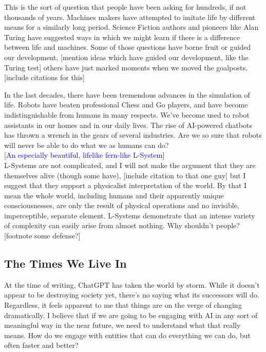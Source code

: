 \documentclass[12pt,twoside]{reedthesis}
\begin{document}
	This is the sort of question that people have been asking for hundreds, if not thousands of years. Machines makers have attempted to imitate life by different means for a similarly long period. Science Fiction authors and pioneers like Alan Turing have suggested ways in which we might learn if there is a difference between life and machines. Some of those questions have borne fruit or guided our development, [mention ideas which have guided our development, like the Turing test] others have just marked moments when we moved the goalposts. [include citations for this] 
	
	In the last decades, there have been tremendous advances in the simulation of life. Robots have beaten professional Chess and Go players, and have become indistinguishable from humans in many respects. We've become used to robot assistants in our homes and in our daily lives. The rise of AI-powered chatbots has thrown a wrench in the gears of several industries. Are we so sure that robots will never be able to do what we as humans can do?\\
	
	\textcolor{blue}{[An especially beautiful, lifelike fern-like L-System]}\\
	
	L-Systems are not complicated, and I will not make the argument that they are themselves alive (though some have), [include citation to that one guy] but I suggest that they support a physicalist interpretation of the world. By that I mean the whole world, including humans and their apparently unique consciousnesses, are only the result of physical operations and no invisible, imperceptible, separate element. L-Systems demonstrate that an intense variety of complexity can easily arise from almost nothing. Why shouldn't people? [footnote some defense?]

\subsection{The Times We Live In} %
\label{AI-Art}

	At the time of writing, ChatGPT has taken the world by storm. While it doesn't appear to be destroying society yet, there's no saying what its successors will do. Regardless, it feels apparent to me that things are on the verge of changing dramatically. I believe that if we are going to be engaging with AI in any sort of meaningful way in the near future, we need to understand what that really means. How do we engage with entities that can do everything we can do, but often faster and better?
	
\end{document}
